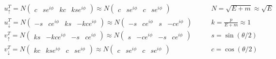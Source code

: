 \begin{align*}
        u_\uparrow^T = N \begin{pmatrix}
                c&se^{i\phi}&kc&kse^{i\phi}
        \end{pmatrix}
        \approx N \begin{pmatrix}
                c&se^{i\phi}&c&se^{i\phi}
        \end{pmatrix}
        &\qquad
        N = \sqrt{E+m} \approx \sqrt{E}
        \\
        u_\downarrow^T = N \begin{pmatrix}
                -s&ce^{i\phi}&ks&-kce^{i\phi}
        \end{pmatrix}
        \approx N \begin{pmatrix}
                -s&ce^{i\phi}&s&-ce^{i\phi}
        \end{pmatrix}
        &\qquad
        k = \frac{p}{E+m} \approx 1
        \\
        v_\uparrow^T = N \begin{pmatrix}
                ks&-kce^{i\phi}&-s&ce^{i\phi}
        \end{pmatrix}
        \approx N \begin{pmatrix}
                s&-ce^{i\phi}&-s&ce^{i\phi}
        \end{pmatrix}
        &\qquad
        s = \sin(\theta/2)
        \\
        v_\downarrow^T = N \begin{pmatrix}
                kc&kse^{i\phi}&c&se^{i\phi}
        \end{pmatrix}
        \approx N \begin{pmatrix}
                c&se^{i\phi}&c&se^{i\phi}
        \end{pmatrix}
        &\qquad
        c = \cos(\theta/2)
\end{align*}
